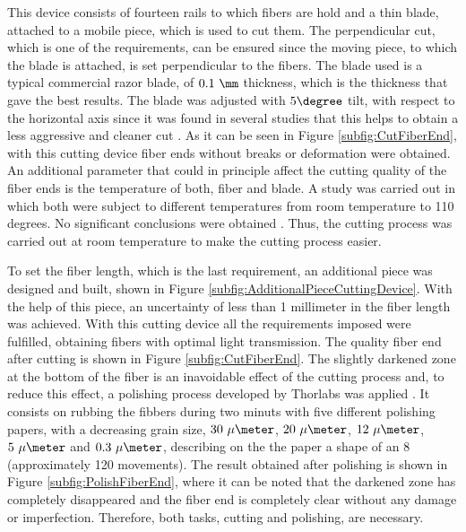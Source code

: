 This device consists of fourteen rails to which fibers are hold and a thin blade, attached to a mobile piece, which is used to cut them. The perpendicular cut, which is one of the requirements, can be ensured since the moving piece, to which the blade is attached, is set perpendicular to the fibers. The blade used is a typical commercial razor blade, of $0.1~\mm$ thickness, which is the thickness that gave the best results. The blade was adjusted with $5\degree$ tilt, with respect to the horizontal axis since it was found in several studies that this helps to obtain a less aggressive and cleaner cut \cite{AngleBlade, TemperatureBlade}. As it can be seen in Figure \ref{subfig:CutFiberEnd}, with this cutting device fiber ends without breaks or deformation were obtained. An additional parameter that could in principle affect the cutting quality of the fiber ends is the temperature of both, fiber and blade. A study was carried out in which both were subject to different temperatures from room temperature to 110 degrees. No significant conclusions were obtained \cite{TFGAlberto}. Thus, the cutting process was carried out at room temperature to make the cutting process easier.

To set the fiber length, which is the last requirement, an additional piece was designed and built, shown in Figure \ref{subfig:AdditionalPieceCuttingDevice}. With the help of this piece, an uncertainty of less than 1 millimeter in the fiber length was achieved. With this cutting device all the requirements imposed were fulfilled, obtaining fibers with optimal light transmission. The quality fiber end after cutting is shown in Figure \ref{subfig:CutFiberEnd}. The slightly darkened zone at the bottom of the fiber is an inavoidable effect of the cutting process and, to reduce this effect, a polishing process developed by Thorlabs was applied \cite{DiamondThorlabs}. It consists on rubbing the fibbers during two minuts with five different polishing papers, with a decreasing grain size, $30~\mu\meter$, $20~\mu\meter$, $12~\mu\meter$, $5~\mu\meter$ and $0.3~\mu\meter$, describing on the the paper a shape of an 8 (approximately 120 movements). The result obtained after polishing is shown in Figure \ref{subfig:PolishFiberEnd}, where it can be noted that the darkened zone has completely disappeared and the fiber end is completely clear without any damage or imperfection. Therefore, both tasks, cutting and polishing,  are necessary.

